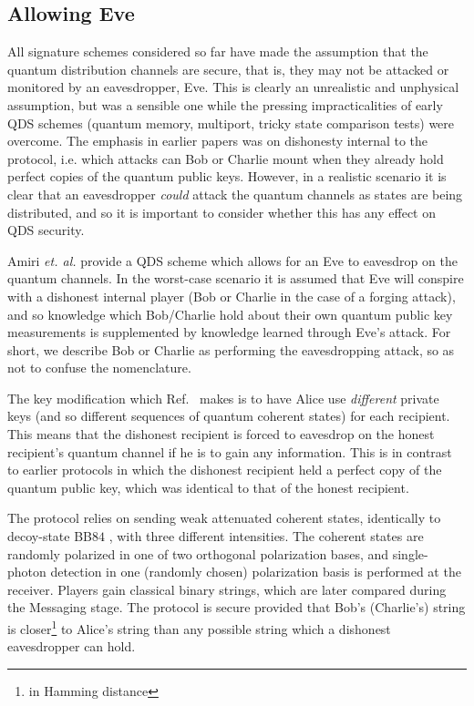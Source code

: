 \subsection*{Allowing Eve}
All signature schemes considered so far have made the assumption that the quantum distribution channels are secure, that is, they may not be attacked or monitored by an eavesdropper, Eve. This is clearly an unrealistic and unphysical assumption, but was a sensible one while the pressing impracticalities of early QDS schemes (quantum memory, multiport, tricky state comparison tests) were overcome. The emphasis in earlier papers was on dishonesty internal to the protocol, i.e. which attacks can Bob or Charlie mount when they already hold perfect copies of the quantum public keys. However, in a realistic scenario it is clear that an eavesdropper \emph{could} attack the quantum channels as states are being distributed, and so it is important to consider whether this has any effect on QDS security.

Amiri \emph{et. al.} provide a QDS scheme which allows for an Eve to eavesdrop on the quantum channels. In the worst-case scenario it is assumed that Eve will conspire with a dishonest internal player (Bob or Charlie in the case of a forging attack), and so knowledge which Bob/Charlie hold about their own quantum public key measurements is supplemented by knowledge learned through Eve's attack. For short, we describe Bob or Charlie as performing the eavesdropping attack, so as not to confuse the nomenclature. 

The key modification which Ref.~\cite{Amiri2016} makes is to have Alice use \emph{different} private keys (and so different sequences of quantum coherent states) for each recipient. This means that the dishonest recipient is forced to eavesdrop on the honest recipient's quantum channel if he is to gain any information. This is in contrast to earlier protocols in which the dishonest recipient held a perfect copy of the quantum public key, which was identical to that of the honest recipient. 



The protocol relies on sending weak attenuated coherent states, identically to decoy-state BB$84$ , with three different intensities. The coherent states are randomly polarized in one of two orthogonal polarization bases, and single-photon detection in one (randomly chosen) polarization basis is performed at the receiver. Players gain classical binary strings, which are later compared during the Messaging stage. The protocol is secure provided that Bob's (Charlie's) string is closer\footnote{in Hamming distance} to Alice's string than any possible string which a dishonest eavesdropper can hold. 

